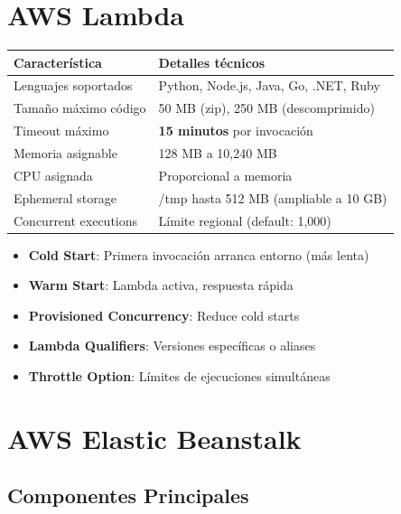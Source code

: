 \documentclass[12pt,a4paper]{report}
\newcommand{\important}[1]{\textcolor{dangerred}{\textbf{#1}}}
\begin{document}
\section{AWS Lambda}

\begin{awsbox}
\begin{center}
\begin{longtable}{|p{4cm}|p{8cm}|}
\hline
\cellcolor{awsorange!20}\textbf{Característica} & \cellcolor{awsorange!20}\textbf{Detalles técnicos} \\
\hline
Lenguajes soportados & Python, Node.js, Java, Go, .NET, Ruby \\
\hline
Tamaño máximo código & 50 MB (zip), 250 MB (descomprimido) \\
\hline
Timeout máximo & \important{15 minutos} por invocación \\
\hline
Memoria asignable & 128 MB a 10,240 MB \\
\hline
CPU asignada & Proporcional a memoria \\
\hline
Ephemeral storage & /tmp hasta 512 MB (ampliable a 10 GB) \\
\hline
Concurrent executions & Límite regional (default: 1,000) \\
\hline
\end{longtable}
\end{center}
\end{awsbox}

\begin{conceptbox}
\begin{itemize}
    \item \textbf{Cold Start}: Primera invocación arranca entorno (más lenta)
    \item \textbf{Warm Start}: Lambda activa, respuesta rápida
    \item \textbf{Provisioned Concurrency}: Reduce cold starts
    \item \textbf{Lambda Qualifiers}: Versiones específicas o aliases
    \item \textbf{Throttle Option}: Límites de ejecuciones simultáneas
\end{itemize}
\end{conceptbox}

\section{AWS Elastic Beanstalk}

\subsection{Componentes Principales}
\end{document}
